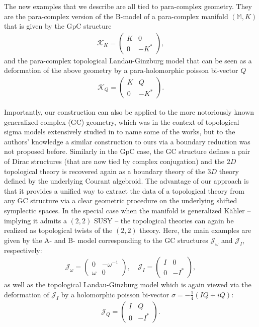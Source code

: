 \documentclass[letterpaper,12pt]{article}
\newcommand{\JJ}{\mathcal{J}}
\newcommand{\KK}{\mathcal{K}}
\newcommand{\Mb}{\mathbb{M}}
\theoremstyle{definition}
\theoremstyle{remark}
\theoremstyle{examples}
\begin{document}
The new examples that we describe are all tied to para-complex geometry. They are the para-complex version of the B-model of a para-complex manifold $(\Mb,K)$ that is given by the GpC structure
\begin{align*}
\KK_K=
\begin{pmatrix}
K & 0 \\
0 & -K^*
\end{pmatrix},
\end{align*}
and the para-complex topological Landau-Ginzburg model that can be seen as a deformation of the above geometry by a para-holomorphic poisson bi-vector $Q$
\begin{align*}
\KK_Q=
\begin{pmatrix}
K & Q \\
0 & -K^*
\end{pmatrix}.
\end{align*}

Importantly, our construction can also be applied to the more notoriously known generalized complex (GC) geometry, which was in the context of topological sigma models extensively studied in \cite{Zucchini:2004ta,Ikeda:2004cm,Kapustin:2004gv,Pestun:2006rj,Cattaneo:2009zx} to name some of the works, but to the authors' knowledge a similar construction to ours via a boundary reduction was not proposed before. Similarly in the GpC case, the GC structure defines a pair of Dirac structures (that are now tied by complex conjugation) and the $2D$ topological theory is recovered again as a boundary theory of the $3D$ theory defined by the underlying Courant algebroid. The advantage of our approach is that it provides a unified way to extract the data of a topological theory from any GC structure via a clear geometric procedure on the underlying shifted symplectic spaces. In the special case when the manifold is generalized K\"ahler \cite{Gualtieri:2003dx,Gualtieri:2010fd} -- implying it admits a $(2,2)$ SUSY --  the topological theories can again be realized as topological twists \cite{Kapustin:2004gv} of the $(2,2)$ theory. Here, the main examples are given by the A- and B- model corresponding to the GC structures $\JJ_\omega$ and $\JJ_I$, respectively:
\begin{align*}
\JJ_\omega=
\begin{pmatrix}
0 & -\omega^{-1} \\
\omega & 0
\end{pmatrix}, \quad
\JJ_I=
\begin{pmatrix}
I & 0 \\
0 & -I^*
\end{pmatrix},
\end{align*}
as well as the topological Landau-Ginzburg model which is again viewed via the deformation of $\JJ_I$ by a holomorphic poisson bi-vector \cite{Gualtieri:2007bq} $\sigma=-\frac{1}{4}(IQ+iQ)$:
\begin{align*}
\JJ_Q=
\begin{pmatrix}
I & Q \\
0 & -I^*
\end{pmatrix}.
\end{align*}
\end{document}
